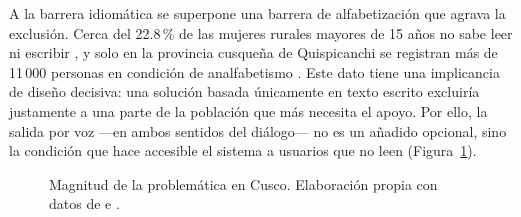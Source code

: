 \documentclass[12pt,a4paper]{article}
\begin{document}
A la barrera idiom{\'a}tica se superpone una barrera de alfabetizaci{\'o}n que agrava la
exclusi{\'o}n. Cerca del 22.8\,\% de las mujeres rurales mayores de 15 a{\~n}os no sabe leer ni
escribir \parencite{inei2023}, y solo en la provincia cusque{\~n}a de Quispicanchi se registran
m{\'a}s de 11\,000 personas en condici{\'o}n de analfabetismo \parencite{dispurse2023}. Este
dato tiene una implicancia de dise{\~n}o decisiva: una soluci{\'o}n basada {\'u}nicamente en
texto escrito excluir{\'i}a justamente a una parte de la poblaci{\'o}n que m{\'a}s necesita el
apoyo. Por ello, la salida por voz ---en ambos sentidos del di{\'a}logo--- no es un a{\~n}adido
opcional, sino la condici{\'o}n que hace accesible el sistema a usuarios que no leen
(Figura~\ref{fig:barreras}).

\begin{figure}[H]
\centering
{}
\caption{Magnitud de la problem{\'a}tica en Cusco. Elaboraci{\'o}n propia con datos de \textcite{essalud2023} e \textcite{inei2023}.}
\label{fig:barreras}
\end{figure}
\end{document}
